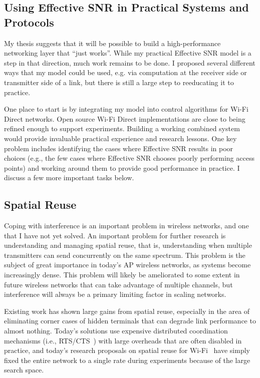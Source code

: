 \subsection{Using Effective SNR in Practical Systems and Protocols}
My thesis suggests that it will be possible to build a high-performance networking layer that ``just works''. While my practical Effective SNR model is a step in that direction, much work remains to be done. I proposed several different ways that my model could be used, e.g. via computation at the receiver side or transmitter side of a link, but there is still a large step to reeducating it to practice.

One place to start is by integrating my model into control algorithms for Wi-Fi Direct networks. Open source Wi-Fi Direct implementations are close to being refined enough to support experiments. Building a working combined system would provide invaluable practical experience and research lessons. One key problem includes identifying the cases where Effective SNR results in poor choices (e.g., the few cases where Effective SNR chooses poorly performing access points) and working around them to provide good performance in practice. I discuss a few more important tasks below.

\subsection{Spatial Reuse}
Coping with interference is an important problem in wireless networks, and one that I have not yet solved. An important problem for further research is understanding and managing spatial reuse, that is, understanding when multiple transmitters can send concurrently on the same spectrum. This problem is the subject of great importance in today's AP wireless networks, as systems become increasingly dense. This problem will likely be ameliorated to some extent in future wireless networks that can take advantage of multiple channels, but interference will always be a primary limiting factor in scaling networks.

Existing work has shown large gains from spatial reuse, especially in the area of eliminating corner cases of hidden terminals that can degrade link performance to almost nothing. Today's solutions use expensive distributed coordination mechanisms (i.e., RTS/CTS~\cite{Karn_MACA}) with large overheads that are often disabled in practice, and today's research proposals on spatial reuse for Wi-Fi~\cite{Shrivastava_CENTAUR,Vutukuru_CMAP} have simply fixed the entire network to a single rate during experiments because of the large search space.

